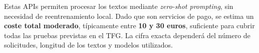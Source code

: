 \documentclass[11pt,a4paper,oneside]{article}
\begin{document}
Estas APIs permiten procesar los textos mediante \textit{zero-shot prompting}, sin necesidad de reentrenamiento local.  
Dado que son servicios de pago, se estima un \textbf{coste total moderado}, típicamente entre \textbf{10 y 30 euros}, suficiente para cubrir todas las pruebas previstas en el TFG. La cifra exacta dependerá del número de solicitudes, longitud de los textos y modelos utilizados.



% 


\end{document}
